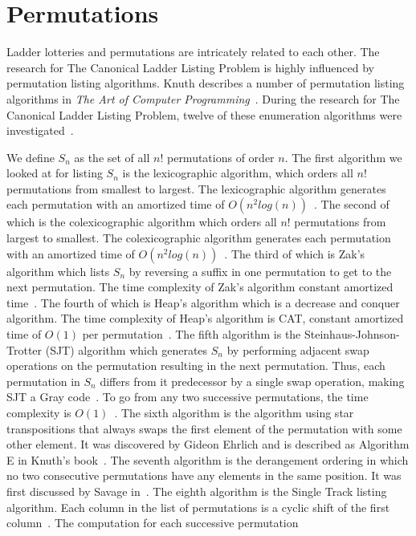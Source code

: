 \section{Permutations}
Ladder lotteries and permutations are intricately related to each other. 
The research for The Canonical Ladder Listing Problem is highly influenced 
by permutation listing algorithms. Knuth describes a number of 
permutation listing algorithms in \emph{The Art of Computer Programming}~\cite{A18}. During the research for The Canonical Ladder Listing Problem, twelve of these 
enumeration algorithms were investigated~\cite{A18,A19,A20,A24,A25,A26,A31,A34,A35,A36,A37}.\par 
We define \emph{$S_{n}$} as the set of all $n!$ permutations of order $n$. 
The first algorithm we looked at for listing $S_{n}$ is the lexicographic algorithm, which orders all $n!$ permutations from smallest to largest. The lexicographic 
algorithm generates each permutation with an amortized time of $O(n^{2}log(n))$~\cite{A20}. The second of which is the 
colexicographic algorithm which orders all $n!$ permutations from largest to smallest. The colexicographic 
algorithm generates each permutation with an amortized time of $O(n^{2}log(n))$~\cite{A19}. The third of which is Zak's 
algorithm which lists $S_{n}$ by reversing a suffix in one permutation to get to the next 
permutation. The time complexity of Zak's algorithm constant amortized time~\cite{A31}.
The fourth of which is Heap's algorithm which is a decrease and conquer algorithm.  
The time complexity of Heap's algorithm is {\sc CAT}, constant amortized time of $O(1)$ per permutation~\cite{A24}.
The fifth algorithm is the Steinhaus-Johnson-Trotter (SJT) algorithm which generates $S_{n}$ by performing adjacent swap operations 
on the permutation resulting in the next permutation. Thus, each permutation in $S_{n}$ differs 
from it predecessor by a single swap operation, making SJT a Gray code~\cite{A25}. To go from any two successive permutations, 
the time complexity is $O(1)$~\cite{A25}.
The sixth algorithm is the algorithm using star transpositions that always swaps the first element of the permutation 
with some other element. It was discovered by Gideon Ehrlich and is described as Algorithm E in Knuth's book~\cite{A18}.
The seventh algorithm is the derangement ordering in which no two consecutive permutations have any elements 
in the same position. It was first discussed by Savage in~\cite{A35}. 
The eighth algorithm is the Single Track listing algorithm. Each column in the list of permutations 
is a cyclic shift of the first column~\cite{A36}. The computation for each successive permutation 

